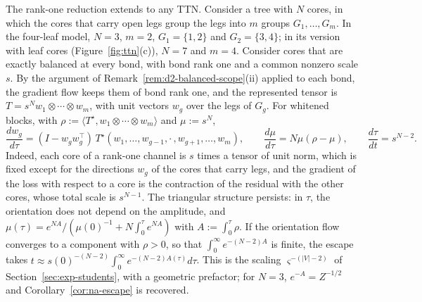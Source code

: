 \documentclass[11pt]{article}
\newcommand{\ip}[2]{\langle #1,#2\rangle}
\theoremstyle{definition}
\numberwithin{equation}{section}
\begin{document}
The rank-one reduction extends to any TTN. Consider a tree with $N$ cores, in which the cores that carry open legs group the legs into $m$ groups $G_1,\dots,G_m$. In the four-leaf model, $N=3$, $m=2$, $G_1=\{1,2\}$ and $G_2=\{3,4\}$; in its version with leaf cores (Figure~\ref{fig:ttn}(c)), $N=7$ and $m=4$. Consider cores that are exactly balanced at every bond, with bond rank one and a common nonzero scale $s$. By the argument of Remark~\ref{rem:d2-balanced-scope}(ii) applied to each bond, the gradient flow keeps them of bond rank one, and the represented tensor is $T=s^Nw_1\otimes\cdots\otimes w_m$, with unit vectors $w_g$ over the legs of $G_g$. For whitened blocks, with $\rho:=\ip{T^\star}{w_1\otimes\cdots\otimes w_m}$ and $\mu:=s^N$,
\begin{equation}\label{eq:na-tree}
\frac{dw_g}{d\tau}=(I-w_gw_g^\top)\,T^\star(w_1,\dots,w_{g-1},\cdot\,,w_{g+1},\dots,w_m),\qquad\frac{d\mu}{d\tau}=N\mu(\rho-\mu),\qquad\frac{d\tau}{dt}=s^{N-2}.
\end{equation}
Indeed, each core of a rank-one channel is $s$ times a tensor of unit norm, which is fixed except for the directions $w_g$ of the cores that carry legs, and the gradient of the loss with respect to a core is the contraction of the residual with the other cores, whose total scale is $s^{N-1}$. The triangular structure persists: in $\tau$, the orientation does not depend on the amplitude, and $\mu(\tau)=e^{NA}/(\mu(0)^{-1}+N\int_0^\tau e^{NA})$ with $A:=\int_0^\tau\rho$. If the orientation flow converges to a component with $\rho>0$, so that $\int_0^\infty e^{-(N-2)A}$ is finite, the escape takes $t\approx s(0)^{-(N-2)}\int_0^\infty e^{-(N-2)A(\tau)}d\tau$. This is the scaling $\varsigma^{-(|V|-2)}$ of Section~\ref{sec:exp-students}, with a geometric prefactor; for $N=3$, $e^{-A}=Z^{-1/2}$ and Corollary~\ref{cor:na-escape} is recovered.
\end{document}
